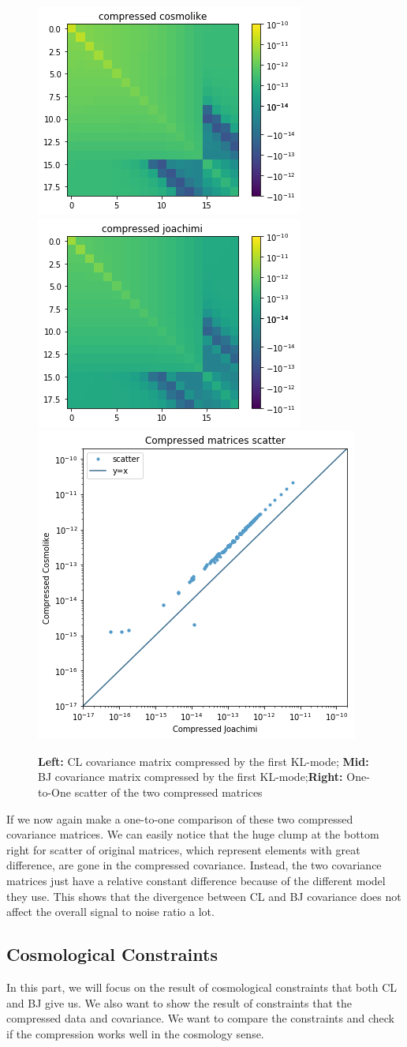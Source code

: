 \documentclass[twocolumn]{\docclass}
\begin{document}
\begin{figure}
	\includegraphics[width=0.34\columnwidth]{kl_comp_cl.png}
	\includegraphics[width=0.34\columnwidth]{kl_comp_bj.png}
	\includegraphics[width=0.27\columnwidth]{kl_scatter.png}
	\caption{\textbf{Left:} CL covariance matrix compressed by the first KL-mode; \textbf{Mid:} BJ covariance matrix compressed by the first KL-mode;\textbf{Right:} One-to-One scatter of the two compressed matrices \label{fig:comp-cov}}
\end{figure}

If we now again make a one-to-one comparison of these two compressed covariance matrices. We can easily notice that the huge clump at the bottom right for scatter of original matrices, which represent elements with great difference, are gone in the compressed covariance. Instead, the two covariance matrices just have a relative constant difference because of the different model they use. This shows that the divergence between CL and BJ covariance does not affect the overall signal to noise ratio a lot.



\subsection{Cosmological Constraints}

In this part, we will focus on the result of cosmological constraints that both CL and BJ give us. We also want to show the result of constraints that the compressed data and covariance. We want to compare the constraints and check if the compression works well in the cosmology sense.
\end{document}
